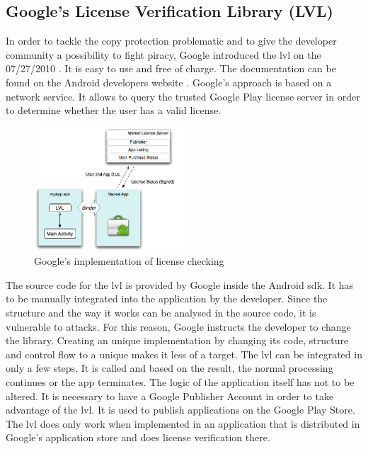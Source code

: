 \subsection{Google's License Verification Library (LVL)} \label{section:license-google}
In order to tackle the copy protection problematic and to give the developer community a possibility to fight piracy, Google introduced the \gls{lvl} on the 07/27/2010 \cite{developersLicensingBlog}.
It is easy to use and free of charge.
The documentation can be found on the Android developers website \cite{developersLicensingOverview}.
\newline
Google's approach is based on a network service.
It allows to query the trusted Google Play license server in order to determine whether the user has a valid license.
\newline
\begin{figure}[h]
    \centering
    \includegraphics[width=0.5\textwidth]{data/lvl.png}
    \caption{Google's implementation of license checking \cite{developersLicensingOverview}}
    \label{fig:lvl}
\end{figure}
The source code for the \gls{lvl} is provided by Google inside the Android \gls{sdk}.
It has to be manually integrated into the application by the developer.
Since the structure and the way it works can be analysed in the source code, it is vulnerable to attacks.
For this reason, Google instructs the developer to change the library.
Creating an unique implementation by changing its code, structure and control flow to a unique makes it less of a target.
The \gls{lvl} can be integrated in only a few steps.
It is called and based on the result, the normal processing continues or the app terminates.
The logic of the application itself has not to be altered.
\newline
It is necessary to have a Google Publisher Account in order to take advantage of the \gls{lvl}.
It is used to publish applications on the Google Play Store.
The \gls{lvl} does only work when implemented in an application that is distributed in Google's application store and does license verification there.
